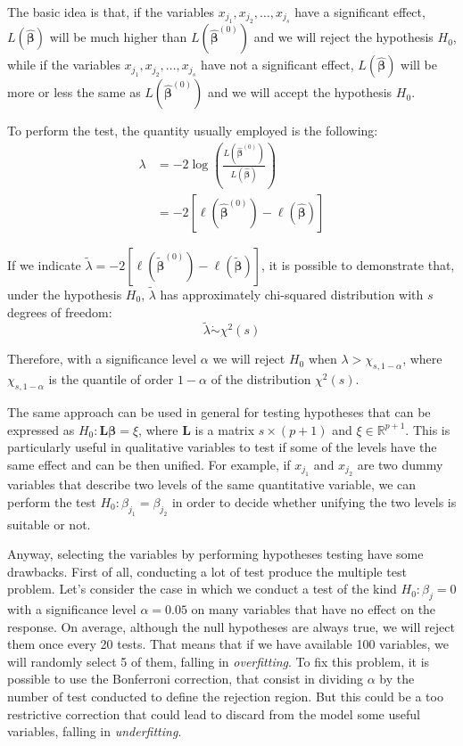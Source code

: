 \documentclass[a4paper, twoside, openright, 12pt]{report}
\theoremstyle{definition}
\theoremstyle{definition}
\theoremstyle{definition}
\theoremstyle{remark}
\begin{document}
The basic idea is that, if the variables \(x_{j_1}, x_{j_2}, \dots, x_{j_s}\) have a significant effect, \(L\left(\hat{\boldsymbol{\beta}}\right)\) will be much higher than \(L\left(\hat{\boldsymbol{\beta}}^{(0)}\right)\) and we will reject the hypothesis \(H_0\), while if the variables \(x_{j_1}, x_{j_2}, \dots, x_{j_s}\) have not a significant effect, \(L\left(\hat{\boldsymbol{\beta}}\right)\) will be more or less the same as \(L\left(\hat{\boldsymbol{\beta}}^{(0)}\right)\) and we will accept the hypothesis \(H_0\).

To perform the test, the quantity usually employed is the following:
\begin{align*}
\lambda & = -2 \log{\left( \frac{L\left(\hat{\boldsymbol{\beta}}^{(0)}\right)}{L\left(\hat{\boldsymbol{\beta}}\right)} \right)} \\
& = -2 \left[ \ell\left(\hat{\boldsymbol{\beta}}^{(0)}\right) - \ell\left(\hat{\boldsymbol{\beta}}\right) \right]
\end{align*}

If we indicate \(\tilde{\lambda} = -2 \left[ \ell\left(\tilde{\boldsymbol{\beta}}^{(0)}\right) - \ell\left(\tilde{\boldsymbol{\beta}}\right) \right]\), it is possible to demonstrate that, under the hypothesis \(H_0\), \(\tilde{\lambda}\) has approximately chi-squared distribution with \(s\) degrees of freedom:
\[
\tilde{\lambda} \dot\sim \chi^2(s)
\]

Therefore, with a significance level \(\alpha\) we will reject \(H_0\) when \(\lambda > \chi_{s, 1-\alpha}\), where \(\chi_{s, 1-\alpha}\) is the quantile of order \(1-\alpha\) of the distribution \(\chi^2(s)\).

The same approach can be used in general for testing hypotheses that can be expressed as \(H_0: \boldsymbol{L}\boldsymbol{\beta} = \xi\), where \(\boldsymbol{L}\) is a matrix \(s\times(p+1)\) and \(\xi\in\mathbb{R}^{p+1}\). This is particularly useful in qualitative variables to test if some of the levels have the same effect and can be then unified. For example, if \(x_{j_1}\) and \(x_{j_2}\) are two dummy variables that describe two levels of the same quantitative variable, we can perform the test \(H_0: \beta_{j_1} = \beta_{j_2}\) in order to decide whether unifying the two levels is suitable or not.

Anyway, selecting the variables by performing hypotheses testing have some drawbacks. First of all, conducting a lot of test produce the multiple test problem. Let's consider the case in which we conduct a test of the kind \(H_0: \beta_j = 0\) with a significance level \(\alpha=0.05\) on many variables that have no effect on the response. On average, although the null hypotheses are always true, we will reject them once every 20 tests. That means that if we have available 100 variables, we will randomly select 5 of them, falling in \emph{overfitting}. To fix this problem, it is possible to use the Bonferroni correction, that consist in dividing \(\alpha\) by the number of test conducted to define the rejection region. But this could be a too restrictive correction that could lead to discard from the model some useful variables, falling in \emph{underfitting}.
\end{document}
